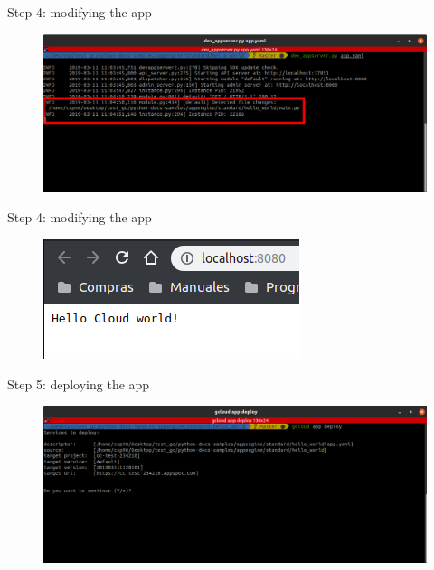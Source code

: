 \documentclass{beamer}
\begin{document}
\begin{frame}[fragile]{Step 4: modifying the app}
    \begin{figure}[H]
      \centering
      \includegraphics[scale=0.33]{img/tutorial/6modify}
    \end{figure}
\end{frame}

\begin{frame}[fragile]{Step 4: modifying the app}
    \begin{figure}[H]
      \centering
      \includegraphics[scale=1]{img/tutorial/7browsemodify}
    \end{figure}
\end{frame}


\begin{frame}[fragile]{Step 5: deploying the app}
    \begin{figure}[H]
      \centering
      \includegraphics[scale=0.33]{img/tutorial/8deploy}
    \end{figure}
\end{frame}
\end{document}
